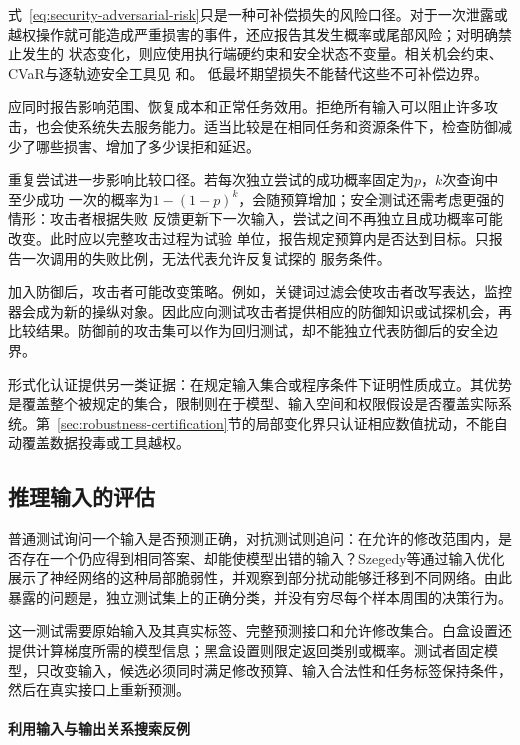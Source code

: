 式~\eqref{eq:security-adversarial-risk}只是一种可补偿损失的风险口径。对于一次泄露或
越权操作就可能造成严重损害的事件，还应报告其发生概率或尾部风险；对明确禁止发生的
状态变化，则应使用执行端硬约束和安全状态不变量。相关机会约束、CVaR与逐轨迹安全工具见
和。
低最坏期望损失不能替代这些不可补偿边界。

应同时报告影响范围、恢复成本和正常任务效用。拒绝所有输入可以阻止许多攻击，也会使系统失去服务能力。适当比较是在相同任务和资源条件下，检查防御减少了哪些损害、增加了多少误拒和延迟。

重复尝试进一步影响比较口径。若每次独立尝试的成功概率固定为$p$，$k$次查询中至少成功
一次的概率为$1-(1-p)^k$，会随预算增加；安全测试还需考虑更强的情形：攻击者根据失败
反馈更新下一次输入，尝试之间不再独立且成功概率可能改变。此时应以完整攻击过程为试验
单位，报告规定预算内是否达到目标。只报告一次调用的失败比例，无法代表允许反复试探的
服务条件。

加入防御后，攻击者可能改变策略。例如，关键词过滤会使攻击者改写表达，监控器会成为新的操纵对象。因此应向测试攻击者提供相应的防御知识或试探机会，再比较结果。防御前的攻击集可以作为回归测试，却不能独立代表防御后的安全边界。

形式化认证提供另一类证据：在规定输入集合或程序条件下证明性质成立。其优势是覆盖整个被规定的集合，限制则在于模型、输入空间和权限假设是否覆盖实际系统。第~\ref{sec:robustness-certification}节的局部变化界只认证相应数值扰动，不能自动覆盖数据投毒或工具越权。

\subsection{推理输入的评估}
\label{sec:security-prediction-test}

普通测试询问一个输入是否预测正确，对抗测试则追问：在允许的修改范围内，是否存在一个仍应得到相同答案、却能使模型出错的输入？Szegedy等通过输入优化展示了神经网络的这种局部脆弱性，并观察到部分扰动能够迁移到不同网络。由此暴露的问题是，独立测试集上的正确分类，并没有穷尽每个样本周围的决策行为。

这一测试需要原始输入及其真实标签、完整预测接口和允许修改集合。白盒设置还提供计算梯度所需的模型信息；黑盒设置则限定返回类别或概率。测试者固定模型，只改变输入，候选必须同时满足修改预算、输入合法性和任务标签保持条件，然后在真实接口上重新预测。

\paragraph{利用输入与输出关系搜索反例}

